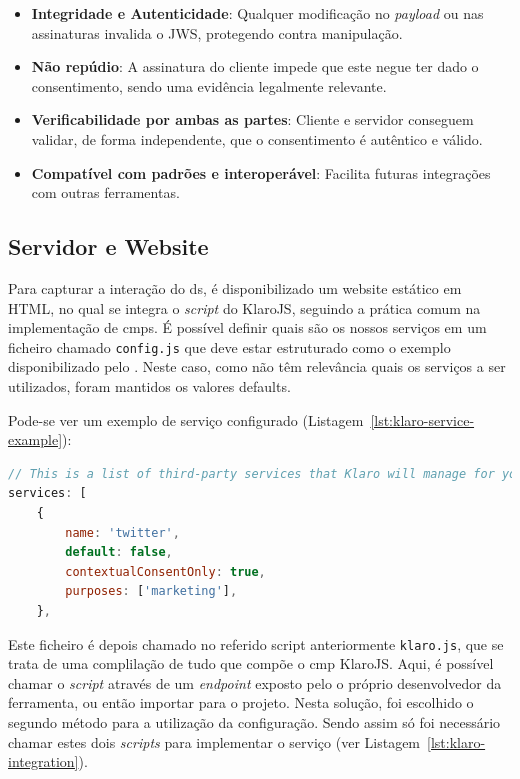 \begin{itemize}
  \item \textbf{Integridade e Autenticidade}: Qualquer modificação no \textit{payload} ou nas assinaturas invalida o JWS, protegendo contra manipulação.
  \item \textbf{Não repúdio}: A assinatura do cliente impede que este negue ter dado o consentimento, sendo uma evidência legalmente relevante.
  \item \textbf{Verificabilidade por ambas as partes}: Cliente e servidor conseguem validar, de forma independente, que o consentimento é autêntico e válido.
  \item \textbf{Compatível com padrões e interoperável}: Facilita futuras integrações com outras ferramentas.
\end{itemize}


\subsection{Servidor e Website}

Para capturar a interação do \acrshort{ds}, é disponibilizado um website estático em HTML, no qual se integra o \textit{script} do KlaroJS, seguindo a prática comum na implementação de \acrshort{cmp}s.
É possível definir quais são os nossos serviços em um ficheiro chamado \texttt{config.js} que deve estar estruturado como o exemplo disponibilizado pelo \cite{gitklaro}. Neste caso, como não têm relevância quais os serviços a ser utilizados, foram mantidos os valores defaults.

Pode-se ver um exemplo de serviço configurado (Listagem~\ref{lst:klaro-service-example}):


\begin{lstlisting}[language=Javascript, caption={Exemplo de serviço configurado no KlaroJS}, label={lst:klaro-service-example}]
// This is a list of third-party services that Klaro will manage for you.
services: [
	{
		name: 'twitter',
		default: false,
		contextualConsentOnly: true,
		purposes: ['marketing'],
	},
\end{lstlisting}

Este ficheiro é depois chamado no referido script anteriormente \texttt{klaro.js}, que se trata de uma complilação de tudo que compõe o \acrshort{cmp} KlaroJS. Aqui, é possível chamar o \textit{script} através de um \textit{endpoint} exposto pelo o próprio desenvolvedor da ferramenta, ou então importar para o projeto. Nesta solução, foi escolhido o segundo método para a utilização da configuração.
Sendo assim só foi necessário chamar estes dois \textit{scripts} para implementar o serviço (ver Listagem~\ref{lst:klaro-integration}).

